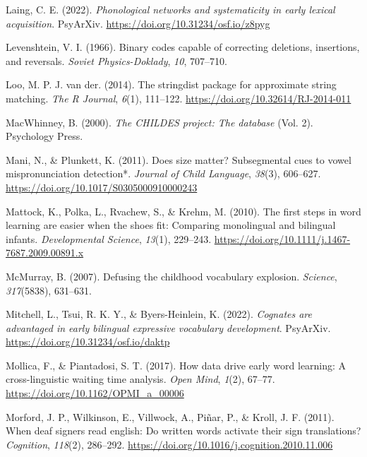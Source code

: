 \documentclass[
]{article}
\newlength{\cslhangindent}
\newlength{\cslentryspacingunit} %
\newenvironment{CSLReferences}[2] %
 {%
  \setlength{\parindent}{0pt}
  \ifodd #1
  \let\oldpar\par
  \def\par{\hangindent=\cslhangindent\oldpar}
  \fi
  \setlength{\parskip}{#2\cslentryspacingunit}
 }%
 {}
\begin{document}
\begin{CSLReferences}{1}{0}
\leavevmode{}%
Laing, C. E. (2022). \emph{Phonological networks and systematicity in
early lexical acquisition}. {PsyArXiv}.
\url{https://doi.org/10.31234/osf.io/z8pyg}

\leavevmode{}%
Levenshtein, V. I. (1966). Binary codes capable of correcting deletions,
insertions, and reversals. \emph{Soviet Physics-Doklady}, \emph{10},
707--710.

\leavevmode{}%
Loo, M. P. J. van der. (2014). The stringdist package for approximate
string matching. \emph{The R Journal}, \emph{6}(1), 111--122.
\url{https://doi.org/10.32614/RJ-2014-011}

\leavevmode{}%
MacWhinney, B. (2000). \emph{The {CHILDES} project: The database} (Vol.
2). Psychology Press.

\leavevmode{}%
Mani, N., \& Plunkett, K. (2011). Does size matter? Subsegmental cues to
vowel mispronunciation detection*. \emph{Journal of Child Language},
\emph{38}(3), 606--627. \url{https://doi.org/10.1017/S0305000910000243}

\leavevmode{}%
Mattock, K., Polka, L., Rvachew, S., \& Krehm, M. (2010). The first
steps in word learning are easier when the shoes fit: Comparing
monolingual and bilingual infants. \emph{Developmental Science},
\emph{13}(1), 229--243.
\url{https://doi.org/10.1111/j.1467-7687.2009.00891.x}

\leavevmode{}%
McMurray, B. (2007). Defusing the childhood vocabulary explosion.
\emph{Science}, \emph{317}(5838), 631--631.

\leavevmode{}%
Mitchell, L., Tsui, R. K. Y., \& Byers-Heinlein, K. (2022).
\emph{Cognates are advantaged in early bilingual expressive vocabulary
development}. {PsyArXiv}. \url{https://doi.org/10.31234/osf.io/daktp}

\leavevmode{}%
Mollica, F., \& Piantadosi, S. T. (2017). How data drive early word
learning: A cross-linguistic waiting time analysis. \emph{Open Mind},
\emph{1}(2), 67--77. \url{https://doi.org/10.1162/OPMI_a_00006}

\leavevmode{}%
Morford, J. P., Wilkinson, E., Villwock, A., Piñar, P., \& Kroll, J. F.
(2011). When deaf signers read english: Do written words activate their
sign translations? \emph{Cognition}, \emph{118}(2), 286--292.
\url{https://doi.org/10.1016/j.cognition.2010.11.006}


\end{CSLReferences}
\end{document}
